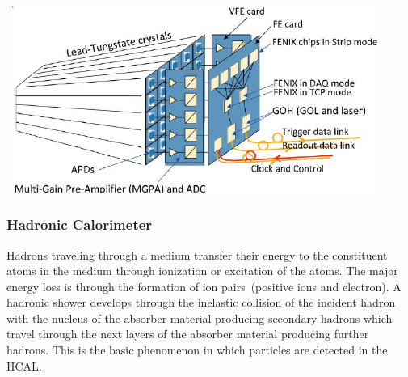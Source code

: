 \vspace{5mm}

\begin{minipage}{0.99\textwidth} 
\begin{center}
\mbox{
\includegraphics[height=0.6\textwidth, width=0.9\textwidth]{THESISPLOTS/ECAL-FRONT-END-ELECTRONICS.jpg}
} 
\label{fig:readout2}
\end{center}
\end{minipage}

\subsubsection{Hadronic Calorimeter}
Hadrons traveling through a medium transfer their energy to the constituent atoms in the medium through ionization or excitation of the atoms. The major energy loss is through the formation of ion pairs~(positive ions and electron). A hadronic shower develops through the inelastic collision of the incident hadron with the nucleus of the absorber material producing secondary hadrons which travel through the next layers of the absorber material producing further hadrons. This is the basic phenomenon in which particles are detected in the HCAL.

